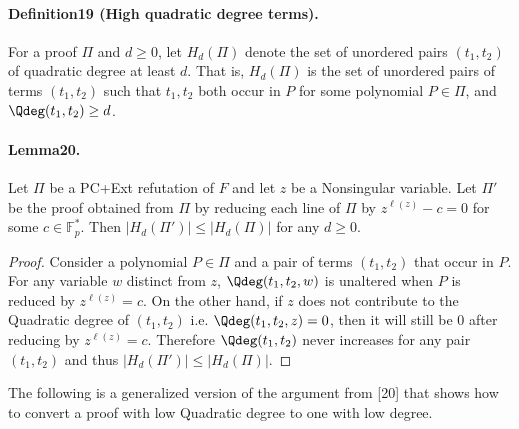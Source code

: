 \paragraph{Definition19 (High quadratic degree terms).} For a proof $\Pi$ and $d\geq0$, let $H_d(\Pi)$ denote the set of unordered pairs $(t_1,t_2)$ of quadratic degree at least $d$. That is, $H_d(\Pi)$ is the set of unordered pairs of terms $(t_1,t_2)$ such that $t_1,t_2$ both occur in $P$ for some polynomial $P\in\Pi$, and $\Qdeg(t_1,t_2)\geq d$.
\paragraph{Lemma20.} Let $\Pi$ be a PC+Ext refutation of $F$ and let $z$ be a Nonsingular variable. Let $\Pi'$ be the proof obtained from $\Pi$ by reducing each line of $\Pi$ by $z^{\ell(z)}-c=0$ for some $c\in\mathbb F_p^*$. Then $|H_d(\Pi')|\leq|H_d(\Pi)|$ for any $d\geq0$.
\begin{proof}
Consider a polynomial $P\in\Pi$ and a pair of terms $(t_1,t_2)$ that occur in $P$. For any variable $w$ distinct from $z$, $\Qdeg(t_1,t_2,w)$ is unaltered when $P$ is reduced by $z^{\ell(z)}=c$. On the other hand, if $z$ does not contribute to the Quadratic degree of $(t_1,t_2)$ i.e. $\Qdeg(t_1,t_2,z)=0$, then it will still be $0$ after reducing by $z^{\ell(z)}=c$. Therefore $\Qdeg(t_1,t_2)$ never increases for any pair $(t_1,t_2)$ and thus $|H_d(\Pi')|\leq|H_d(\Pi)|$.
\end{proof}
The following is a generalized version of the argument from [20] that shows how to convert a proof with low Quadratic degree to one with low degree.
